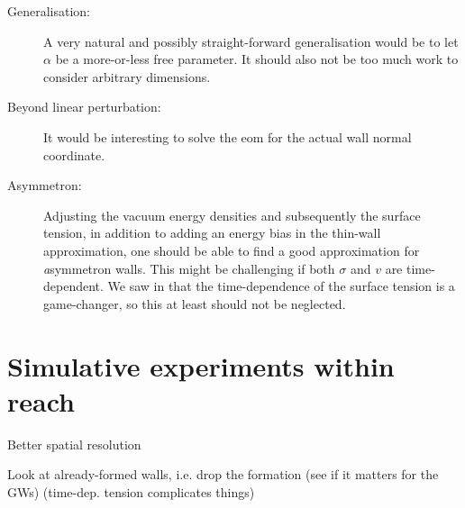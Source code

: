    \begin{description}
        \item[Generalisation:] A very natural and possibly straight-forward generalisation would be to let $\alpha$ be a more-or-less free parameter. It should also not be too much work to consider arbitrary dimensions.
        \item[Beyond linear perturbation:] It would be interesting to solve the eom for the actual wall normal coordinate. 
        \item[Asymmetron:] Adjusting the vacuum energy densities and subsequently the surface tension, in addition to adding an energy bias in the thin-wall approximation, one should be able to find a good approximation for \emph{a}symmetron walls. This might be challenging if both $\sigma$ and $v$ are time-dependent. We saw in  that the time-dependence of the surface tension is a game-changer, so this at least should not be neglected.
    \end{description}






\section{Simulative experiments within reach}
    \begin{bullets}
        \item Better spatial resolution
        \item Look at already-formed walls, i.e. drop the formation (see if it matters for the GWs) (time-dep. tension complicates things)
    \end{bullets}
